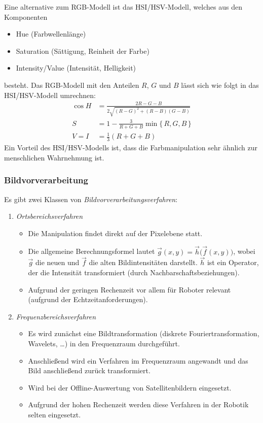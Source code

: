 		Eine alternative zum RGB-Modell ist das HSI/HSV-Modell, welches aus den Komponenten
		\begin{itemize}
			\item Hue (Farbwellenlänge)
			\item Saturation (Sättigung, Reinheit der Farbe)
			\item Intensity/Value (Intensität, Helligkeit)
		\end{itemize}
		besteht. Das RGB-Modell mit den Anteilen \(R\), \(G\) und \(B\) lässt sich wie folgt in das HSI/HSV-Modell umrechnen:
		\begin{align*}
			\cos H & = \frac{2R - G - B}{2\sqrt{(R - G)^2 + (R - B)(G - B)}} \\
			S      & = 1 - \frac{3}{R + G + B} \min \{\, R, G, B \,\}        \\
			V = I  & = \frac{1}{3} (R + G + B)
		\end{align*}
		Ein Vorteil des HSI/HSV-Modells ist, dass die Farbmanipulation sehr ähnlich zur menschlichen Wahrnehmung ist.

	\subsubsection{Bildvorverarbeitung}
		Es gibt zwei Klassen von \emph{Bildvorverarbeitungsverfahren}:
		\begin{enumerate}
			\item \emph{Ortsbereichsverfahren}
				\begin{itemize}
					\item Die Manipulation findet direkt auf der Pixelebene statt.
					\item Die allgemeine Berechnungsformel lautet \( \vec{g}(x, y) = \vec{h}\big(\vec{f}(x, y)\big) \), wobei \(\vec{g}\) die neuen und \(\vec{f}\) die alten Bildintensitäten darstellt. \(\vec{h}\) ist ein Operator, der die Intensität transformiert (\bspw durch Nachbarschaftsbeziehungen).
					\item Aufgrund der geringen Rechenzeit vor allem für Roboter relevant (aufgrund der Echtzeitanforderungen).
				\end{itemize}
			\item \emph{Frequenzbereichsverfahren}
				\begin{itemize}
					\item Es wird zunächst eine Bildtransformation (diskrete Fouriertransformation, Wavelets, \dots) in den Frequenzraum durchgeführt.
					\item Anschließend wird ein Verfahren im Frequenzraum angewandt und das Bild anschließend zurück transformiert.
					\item Wird \bspw bei der Offline-Auswertung von Satellitenbildern eingesetzt.
					\item Aufgrund der hohen Rechenzeit werden diese Verfahren in der Robotik selten eingesetzt.
				\end{itemize}
		\end{enumerate}

